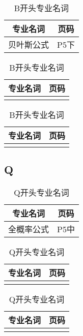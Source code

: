 \documentclass{wx672article}
\begin{document}
      \begin{table}[h!] %
        \centering
        \begin{tabular}[t]{c|c} %
          \hline
          专业名词 &  页码   \\
          \hline
          贝叶斯公式 &  P5下\\
          \hline
        \end{tabular}
        \hfill
        \begin{tabular}[t]{c|c}
          \hline
          专业名词  &  页码  \\
          \hline
                    &  \\
          \hline
        \end{tabular}
        \hfill
        \begin{tabular}[t]{c|c}
          \hline
          专业名词 &  页码 \\
          \hline
                   &  \\
          \hline
        \end{tabular}
        \caption{B开头专业名词}\label{tabB}
      \end{table}


    \begin{center}
      \section*{Q}
    \end{center}
    \label{sec:q}


    \begin{table}[h!] %
      \centering
        \begin{tabular}[t]{c|c} %
          \hline
          专业名词 &  页码   \\
          \hline
          全概率公式 & P5中 \\
          \hline
        \end{tabular}
        \hfill
        \begin{tabular}[t]{c|c}
          \hline
          专业名词  &  页码  \\
          \hline
           &  \\
          \hline
        \end{tabular}
        \hfill
        \begin{tabular}[t]{c|c}
          \hline
          专业名词 &  页码 \\
          \hline
           &  \\
          \hline
        \end{tabular}
        \caption{Q开头专业名词}\label{tabQ}
    \end{table}
    
\end{document}
